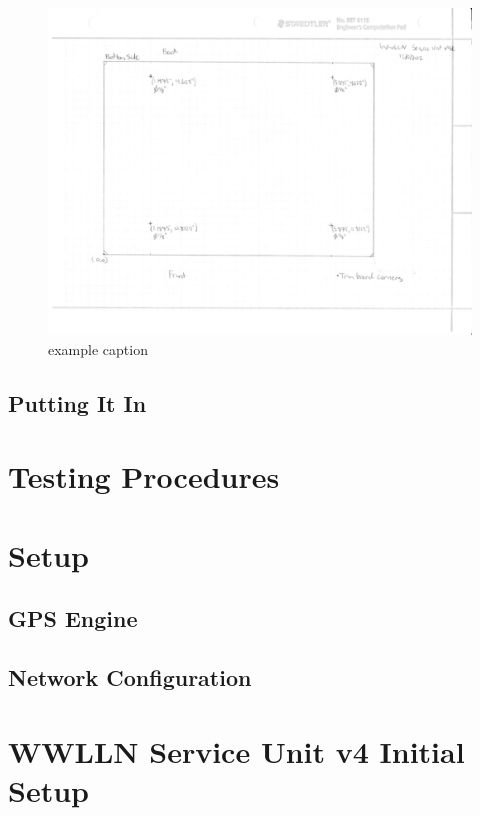 \begin{figure}[ht!]
   \centering
   \includegraphics[scale=1]{Appendix/Figures/su_box_holes_bottom.pdf} 
   \caption{example caption}
   \label{example}
\end{figure}

\subsection{Putting It In}

\section{Testing Procedures}

\section{Setup}

\subsection{GPS Engine}

\subsection{Network Configuration}

\section{WWLLN Service Unit v4 Initial Setup}

